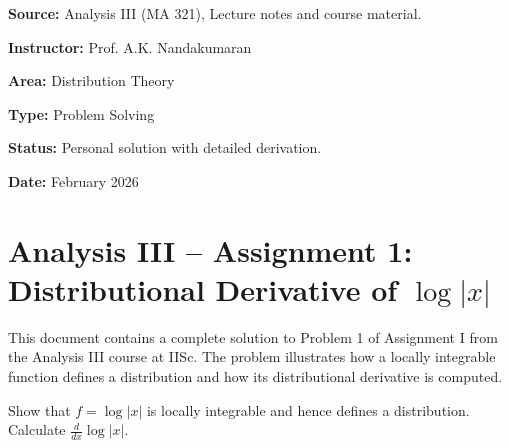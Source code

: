 \noindent\textbf{Source:} Analysis III (MA 321), Lecture notes and course material.

\noindent\textbf{Instructor:} Prof. A.K. Nandakumaran

\noindent\textbf{Area:} Distribution Theory

\noindent\textbf{Type:} Problem Solving

\noindent\textbf{Status:} Personal solution with detailed derivation.

\noindent\textbf{Date:} February 2026

\section*{Analysis III – Assignment 1:
Distributional Derivative of \texorpdfstring{$\log|x|$}{log|x|}}

This document contains a complete solution to Problem 1 of Assignment I from the Analysis III course at IISc. The problem illustrates how a locally integrable function defines a distribution and how its distributional derivative is computed.

\begin{problem}[Problem 1]
    Show that $f=\log|x|$ is locally integrable and hence defines a distribution. Calculate $\frac{d}{dx}\log|x|$.
\end{problem}

